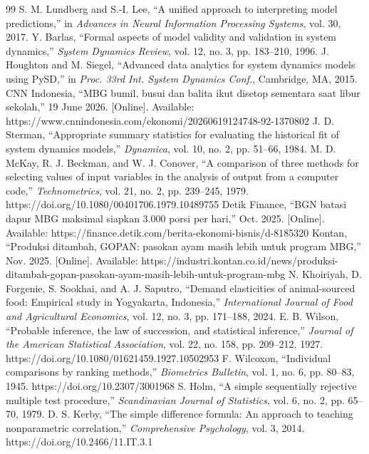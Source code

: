 \documentclass[10pt,twocolumn,a4paper]{article}
\begin{document}
\begin{thebibliography}{99}
 S. M. Lundberg and S.-I. Lee, ``A unified approach to interpreting model predictions,'' in \textit{Advances in Neural Information Processing Systems}, vol. 30, 2017.
 Y. Barlas, ``Formal aspects of model validity and validation in system dynamics,'' \textit{System Dynamics Review}, vol. 12, no. 3, pp. 183--210, 1996.
 J. Houghton and M. Siegel, ``Advanced data analytics for system dynamics models using PySD,'' in \textit{Proc. 33rd Int. System Dynamics Conf.}, Cambridge, MA, 2015.
 CNN Indonesia, ``MBG bumil, busui dan balita ikut disetop sementara saat libur sekolah,'' 19 June 2026. [Online]. Available: https://www.cnnindonesia.com/ekonomi/20260619124748-92-1370802
 J. D. Sterman, ``Appropriate summary statistics for evaluating the historical fit of system dynamics models,'' \textit{Dynamica}, vol. 10, no. 2, pp. 51--66, 1984.
 M. D. McKay, R. J. Beckman, and W. J. Conover, ``A comparison of three methods for selecting values of input variables in the analysis of output from a computer code,'' \textit{Technometrics}, vol. 21, no. 2, pp. 239--245, 1979. https://doi.org/10.1080/00401706.1979.10489755
 Detik Finance, ``BGN batasi dapur MBG maksimal siapkan 3.000 porsi per hari,'' Oct. 2025. [Online]. Available: https://finance.detik.com/berita-ekonomi-bisnis/d-8185320
 Kontan, ``Produksi ditambah, GOPAN: pasokan ayam masih lebih untuk program MBG,'' Nov. 2025. [Online]. Available: https://industri.kontan.co.id/news/produksi-ditambah-gopan-pasokan-ayam-masih-lebih-untuk-program-mbg
 N. Khoiriyah, D. Forgenie, S. Sookhai, and A. J. Saputro, ``Demand elasticities of animal-sourced food: Empirical study in Yogyakarta, Indonesia,'' \textit{International Journal of Food and Agricultural Economics}, vol. 12, no. 3, pp. 171--188, 2024.
 E. B. Wilson, ``Probable inference, the law of succession, and statistical inference,'' \textit{Journal of the American Statistical Association}, vol. 22, no. 158, pp. 209--212, 1927. https://doi.org/10.1080/01621459.1927.10502953
 F. Wilcoxon, ``Individual comparisons by ranking methods,'' \textit{Biometrics Bulletin}, vol. 1, no. 6, pp. 80--83, 1945. https://doi.org/10.2307/3001968
 S. Holm, ``A simple sequentially rejective multiple test procedure,'' \textit{Scandinavian Journal of Statistics}, vol. 6, no. 2, pp. 65--70, 1979.
 D. S. Kerby, ``The simple difference formula: An approach to teaching nonparametric correlation,'' \textit{Comprehensive Psychology}, vol. 3, 2014. https://doi.org/10.2466/11.IT.3.1

\end{thebibliography}
\end{document}
